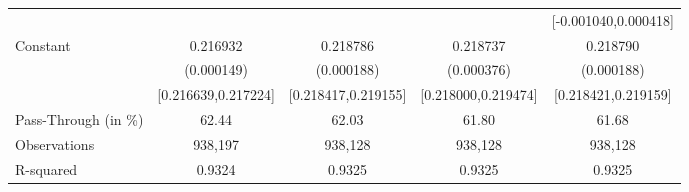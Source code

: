 {\begin{tabular}{l*{4}{c}}
                    &                     &                     &                     &[-0.001040,0.000418]         \\
Constant            &    0.216932\sym{***}&    0.218786\sym{***}&    0.218737\sym{***}&    0.218790\sym{***}\\
                    &  (0.000149)         &  (0.000188)         &  (0.000376)         &  (0.000188)         \\
                    &[0.216639,0.217224]         &[0.218417,0.219155]         &[0.218000,0.219474]         &[0.218421,0.219159]         \\
\midrule
Pass-Through (in \%)&       62.44         &       62.03         &       61.80         &       61.68         \\
Observations        &     938,197         &     938,128         &     938,128         &     938,128         \\
R-squared           &      0.9324         &      0.9325         &      0.9325         &      0.9325         \\
\bottomrule
\end{tabular}
}
